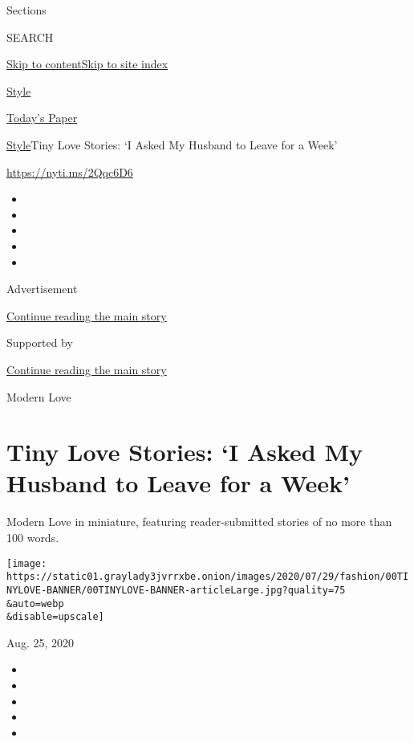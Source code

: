 Sections

SEARCH

\protect\hyperlink{site-content}{Skip to
content}\protect\hyperlink{site-index}{Skip to site index}

\href{https://www.nytimes3xbfgragh.onion/section/style}{Style}

\href{https://myaccount.nytimes3xbfgragh.onion/auth/login?response_type=cookie\&client_id=vi}{}

\href{https://www.nytimes3xbfgragh.onion/section/todayspaper}{Today's
Paper}

\href{/section/style}{Style}\textbar{}Tiny Love Stories: `I Asked My
Husband to Leave for a Week'

\url{https://nyti.ms/2Qqc6D6}

\begin{itemize}
\item
\item
\item
\item
\item
\end{itemize}

Advertisement

\protect\hyperlink{after-top}{Continue reading the main story}

Supported by

\protect\hyperlink{after-sponsor}{Continue reading the main story}

Modern Love

\hypertarget{tiny-love-stories-i-asked-my-husband-to-leave-for-a-week}{%
\section{Tiny Love Stories: `I Asked My Husband to Leave for a
Week'}\label{tiny-love-stories-i-asked-my-husband-to-leave-for-a-week}}

Modern Love in miniature, featuring reader-submitted stories of no more
than 100 words.

\texttt{[image: https://static01.graylady3jvrrxbe.onion/images/2020/07/29/fashion/00TINYLOVE-BANNER/00TINYLOVE-BANNER-articleLarge.jpg?quality=75\\\&auto=webp\\\&disable=upscale]}

Aug. 25, 2020

\begin{itemize}
\item
\item
\item
\item
\item
\end{itemize}

